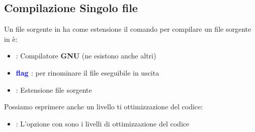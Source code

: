 

\subsection{Compilazione Singolo file}
Un file sorgente in  ha come estensione  il comando per compilare un file sorgente in  è:
\newline


\begin{itemize}
    \item \textbf{\textcolor{blue}{}} : Compilatore \textbf{GNU} (ne esistono anche altri)
    \item \textbf{\textcolor{blue}{flag }} : per rinominare il file eseguibile in uscita
    \item \textbf{\textcolor{blue}{}} : Estensione file sorgente  \newline
\end{itemize}

Possiamo esprimere anche un livello ti ottimizzazione del codice:


\begin{itemize}
    \item \textbf{\textcolor{blue}{}} : L'opzione  con  sono i livelli di ottimizzazione del codice
\end{itemize}

